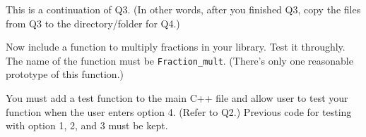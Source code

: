 This is a continuation of Q3.
(In other words, after you finished Q3, copy the files from Q3
to the directory/folder for Q4.)

Now include a function to multiply fractions in your library.
Test it throughly.
The name of the function must be \verb!Fraction_mult!.
(There's only one reasonable prototype of this function.)

You must add a test function to the main C++ file and allow user to test
your function when the user enters option 4. (Refer to Q2.)
Previous code for testing with option 1, 2, and 3 must be kept.
